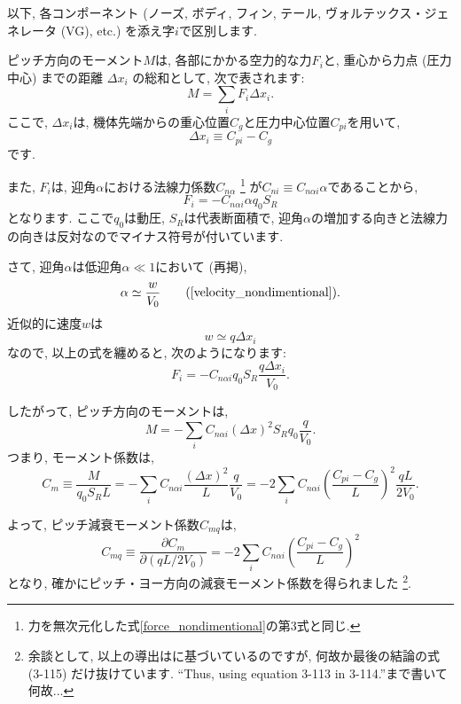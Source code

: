 \documentclass[uplatex,dvipdfmx,a4j,11  pt]{jsarticle}
\begin{document}
\enskip

以下, 各コンポーネント (ノーズ, ボディ, フィン, テール, ヴォルテックス・ジェネレータ (VG), etc.) を添え字$i$で区別します.

ピッチ方向のモーメント$M$は, 各部にかかる空力的な力$F_i$と, 重心から力点 (圧力中心) までの距離 $\Delta x_i$ の総和として, 次で表されます:
\begin{equation}
  M = \sum_i F_i \Delta x_i.
\end{equation}
ここで, $\Delta x_i$は, 機体先端からの重心位置$C_g$と圧力中心位置$C_{pi}$を用いて,
\begin{equation}
  \Delta x_i \equiv C_{pi} - C_g 
\end{equation}
です.

また, $F_i$は, 迎角$\alpha$における法線力係数$C_{n\alpha}$
\footnote{力を無次元化した式\eqref{force_nondimentional}の第3式と同じ.}
が$C_{n i} \equiv C_{n\alpha i} \alpha$であることから, 
\begin{equation}
  F_i = - C_{n\alpha i} \alpha q_0 S_R
\end{equation}
となります.
ここで$q_0$は動圧, $S_R$は代表断面積で, 迎角$\alpha$の増加する向きと法線力の向きは反対なのでマイナス符号が付いています.

さて, 迎角$\alpha$は低迎角$\alpha \ll 1$において (再掲), 
\begin{equation}
  \alpha \simeq \frac{w}{V_0} \tag{\ref{velocity_nondimentional}}.
\end{equation}
近似的に速度$w$は
\begin{equation}
  w \simeq q \Delta x_i
\end{equation}
なので, 以上の式を纏めると, 次のようになります:
\begin{equation}
  F_i = - C_{n\alpha i} q_0 S_R\frac{q\Delta x_i}{V_0}.
\end{equation}

したがって, ピッチ方向のモーメントは,
\begin{equation}
  M = -\sum_i C_{n\alpha i} (\Delta x)^2 S_R q_0 \frac{q}{V_0}.
\end{equation}
つまり, モーメント係数は,
\begin{equation}
  C_{m} \equiv \frac{M}{q_0 S_R L} = - \sum_i C_{n\alpha i} \frac{(\Delta x)^2}{L} \frac{q}{V_0} = - 2\sum_i C_{n\alpha i} \left(\frac{C_{pi} - C_g}{L}\right)^2 \frac{q L}{2V_0}.
\end{equation}

よって, ピッチ減衰モーメント係数$C_{mq}$は,
\begin{equation}
  C_{mq} \equiv \frac{\partial C_m}{\partial (qL/2V_0)} = - 2\sum_i C_{n\alpha i} \left(\frac{C_{pi} - C_g}{L}\right)^2
\end{equation}
となり, 確かにピッチ・ヨー方向の減衰モーメント係数を得られました
\footnote{余談として, 以上の導出は\cite{barrowman}に基づいているのですが, 何故か最後の結論の式 (3-115) だけ抜けています. ``Thus, using equation 3-113 in 3-114.''まで書いて何故...}.




\end{document}
